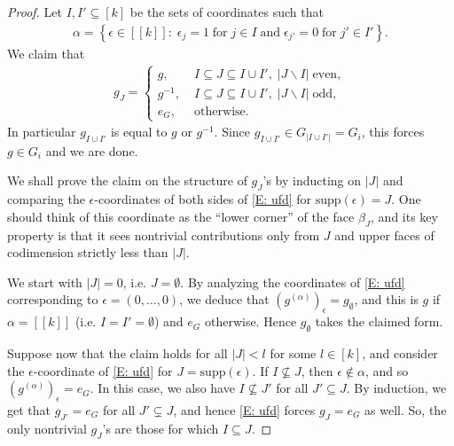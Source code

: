 \documentclass[11pt]{amsart}
\theoremstyle{definition}
\newcommand{\eps}{\epsilon}
\newcommand{\supp}{\textrm{supp}}
\newcommand{\cube}[1]{{[\![#1]\!]}}
\newcommand{\inv}{^{-1}}
\newcommand{\1}{{\mathbf{1}}}
\newcommand{\rem}[1]{\left \{ #1 \right \}}
\begin{document}
\begin{proof}
Let $I,I'\subseteq [k]$ be the sets of coordinates such that 
    \begin{align*}
    \alpha = \rem{\eps\in\cube{k}\colon\; \eps_{j} =1\; \textrm{for}\; j\in I\; \textrm{and}\; \eps_{j'}=0\; \textrm{for}\; j'\in I'}.
\end{align*}
We claim that
\begin{align*}
    g_J =\begin{cases}
        g,\; &I\subseteq J\subseteq I\cup I',\; |J\backslash I|\; \textrm{even},\\
        g\inv,\; &I\subseteq J\subseteq I\cup I',\; |J\backslash I|\; \textrm{odd},\\
        e_G,\; &\textrm{otherwise}.
    \end{cases}
\end{align*}
In particular $g_{I\cup I'}$ is equal to $g$ or $g^{-1}$. Since $g_{I\cup I'}\in G_{\vert I\cup I'\vert}=G_{i}$, this forces $g\in G_{i}$ and we are done.

We shall prove the claim on the structure of $g_J$'s by inducting on $|J|$ and comparing the $\eps$-coordinates of both sides of \eqref{E: ufd} for $\supp(\eps) = J$. One should think of this coordinate as the ``lower corner'' of the face $\beta_J$, and its key property is that it sees nontrivial contributions only from $J$ and upper faces of codimension strictly less than $|J|$. 

We start with $|J| = 0$, i.e. $J =\emptyset$. By analyzing the coordinates of \eqref{E: ufd} corresponding to $\eps = (0, \ldots, 0)$, we deduce that $(g^{(\alpha)})_\eps = g_\emptyset$, and this is $g$ if $\alpha = \cube{k}$ (i.e. $I=I'=\emptyset$) and $e_G$ otherwise. Hence $g_\emptyset$ takes the claimed form.

Suppose now that the claim holds for all $|J|< l$ for some $l\in[k]$, and consider the $\eps$-coordinate of \eqref{E: ufd} for $J = \supp(\eps)$. If $I\not\subseteq J$, then $\eps\notin \alpha$, and so $(g^{(\alpha)})_\eps = e_G$. In this case, we also have $I\not\subseteq J'$ for all $J'\subseteq J$. By induction, we get that $g_{J'} = e_G$ for all $J'\subsetneq J$, and hence \eqref{E: ufd} forces $g_J = e_G$ as well. So, the only nontrivial $g_J$'s are those for which $I\subseteq J$.


\end{proof}
\end{document}
